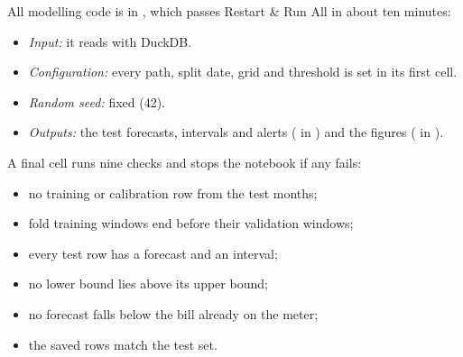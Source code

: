 \documentclass[11pt,letterpaper]{article}
\begin{document}
All modelling code is in , which passes Restart \& Run All in about ten minutes:
\begin{itemize}
  \item \emph{Input:} it reads  with DuckDB.
  \item \emph{Configuration:} every path, split date, grid and threshold is set in its first cell.
  \item \emph{Random seed:} fixed (42).
  \item \emph{Outputs:} the test forecasts, intervals and alerts ( in
  ) and the figures ( in ).
\end{itemize}
A final cell runs nine checks and stops the notebook if any fails:
\begin{itemize}
  \item no training or calibration row from the test months;
  \item fold training windows end before their validation windows;
  \item every test row has a forecast and an interval;
  \item no lower bound lies above its upper bound;
  \item no forecast falls below the bill already on the meter;
  \item the saved rows match the test set.
\end{itemize}

\printbibliography[title={References}]
\end{document}
